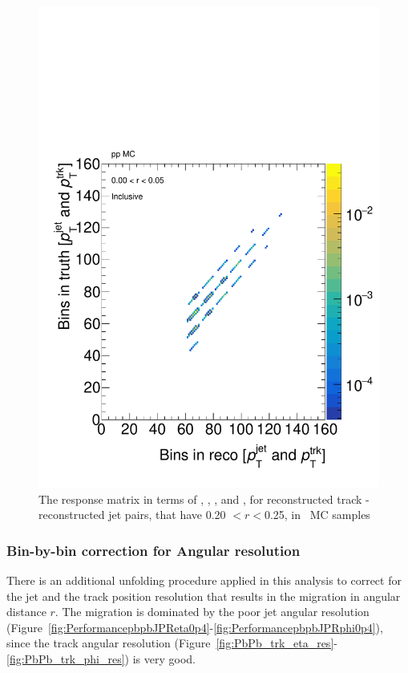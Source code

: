\begin{figure}
\centering
\includegraphics[page=5, width=1.0\textwidth]{figures/main/corrections/resp_matrix_ChPS_pp_MC.pdf}
\caption{The response matrix in terms of \ptjetreco, \ptjettruth, \pttrkreco, and \pttrktruth, for reconstructed track - reconstructed jet pairs, that have 0.20 $< r < $0.25, in \pp\ MC samples}
\label{fig:pp_ChPS_respmatrix}
\end{figure}


\subsubsection{Bin-by-bin correction for Angular resolution}
\label{sec:bbbcorrection}

There is an additional unfolding procedure applied in this analysis to correct for the jet and the track position resolution that results in the migration in angular distance $r$.
The migration is dominated by the poor jet angular resolution (Figure~\ref{fig:PerformancepbpbJPReta0p4}-\ref{fig:PerformancepbpbJPRphi0p4}), since the track angular resolution (Figure~\ref{fig:PbPb_trk_eta_res}-\ref{fig:PbPb_trk_phi_res}) is very good.

